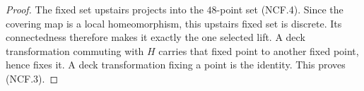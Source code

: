 \begin{proof}
The fixed set upstairs projects into the $48$-point
set (NCF.4). Since the covering map is a local
homeomorphism, this upstairs fixed set is discrete.
Its connectedness therefore makes it exactly the
one selected lift. A deck transformation commuting
with $H$ carries that fixed point to another fixed
point, hence fixes it. A deck transformation fixing
a point is the identity. This proves (NCF.3).
\end{proof}
